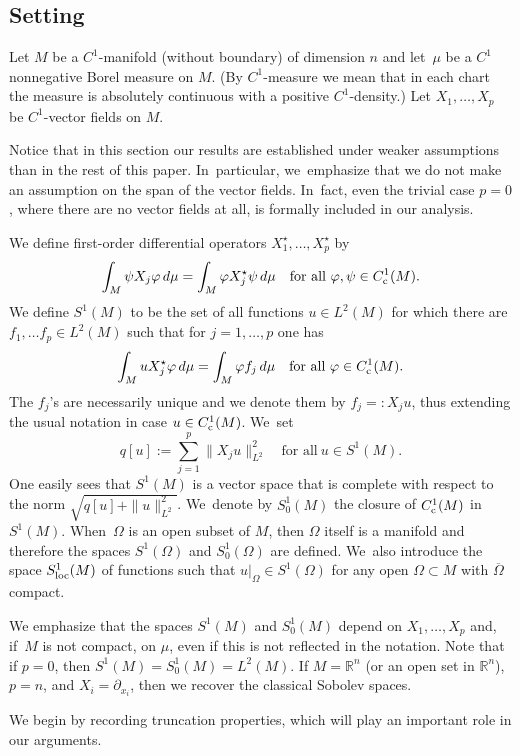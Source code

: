 \documentclass[10pt]{amsart}
\newcommand{\rc}{\textup{c}}
\newcommand{\loc}{\textup{loc}}
\theoremstyle{definition}
\let\phi\varphi
\newcommand{\1}{\mathbbm{1}}
\begin{document}
\subsection{Setting}\label{ss2.2}
Let $M$ be a $C^1$-manifold (without boundary) of dimension $n$ and let~$\mu$ be a $C^1$ nonnegative Borel measure on $M$. (By $C^1$-measure we mean that in each chart the measure is absolutely continuous with a positive $C^1$-density.) Let $X_1,\ldots,X_p$ be $C^1$-vector fields on $M$.

Notice that in this section our results are established under weaker assumptions than in the rest of this paper. In~particular, we~emphasize that we do not make an assumption on the span of the vector fields. In~fact, even the trivial case $p=0$, where there are no vector fields at all, is formally included in our analysis.

We define first-order differential operators $X_1^\star,\ldots,X_p^\star$ by
\[
\int_M \psi X_j \phi\,d\mu = \int_M \phi X_j^\star \psi\,d\mu
\quad\text{for all}\ \phi,\psi\in C^1_\rc(M).
\]
We define $S^1(M)$ to be the set of all functions $u\in L^2(M)$ for which there are $f_1,\ldots f_p\in L^2(M)$ such that for $j=1,\ldots,p$ one has
\[
\int_M u X_j^\star\phi\,d\mu = \int_M \phi f_j\,d\mu
\quad\text{for all}\ \phi\in C^1_\rc(M).
\]
The $f_j$'s are necessarily unique and we denote them by $f_j=:X_j u$, thus extending the usual notation in case $u\in C^1_\rc(M)$. We~set
\[
q[u] := \sum_{j=1}^p \|X_j u\|_{L^2}^2
\quad\text{for all}\ u\in S^1(M).
\]
One easily sees that $S^1(M)$ is a vector space that is complete with respect to the norm $\sqrt{q[u] + \|u\|_{L^2}^2}$. We~denote by $S^1_0(M)$ the closure of $C^1_\rc(M)$ in $S^1(M)$. When~$\Omega$ is an open subset of $M$, then $\Omega$ itself is a manifold and therefore the spaces $S^1(\Omega)$ and $S^1_0(\Omega)$ are defined. We~also introduce the space $S^1_\loc(M)$ of functions such that $u|_\Omega \in S^1(\Omega)$ for any open $\Omega\subset M$ with $\overline\Omega$ compact.

We emphasize that the spaces $S^1(M)$ and $S^1_0(M)$ depend on $X_1,\ldots,X_p$ and, if~$M$ is not compact, on $\mu$, even if this is not reflected in the notation. Note that if $p=0$, then $S^1(M)=S^1_0(M)=L^2(M)$.
If $M=\mathbb R^n$ (or an open set in $\mathbb R^n$), $p=n$, and $X_i=\partial_{x_i}$, then we recover the classical Sobolev spaces.

We begin by recording truncation properties, which will play an important role in our arguments.
\end{document}
